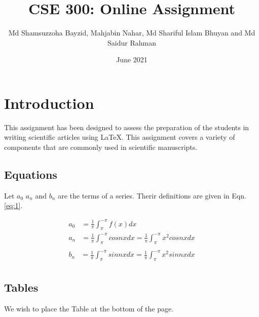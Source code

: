 \documentclass[14pt, a4paper]{article} %
\title{CSE 300: Online Assignment}
\author{Md Shamsuzzoha Bayzid, Mahjabin Nahar, Md Shariful Islam Bhuyan and Md Saidur Rahman}
\date{June 2021}
\begin{document}
\maketitle

\section{Introduction}
This assignment has been designed to assess the preparation of the students in writing scientific articles using \LaTeX. This assignment covers a variety of components that are commonly used in scientific manuscripts.

    \subsection{Equations}
    Let $a_0$ $a_n$ and $b_n$ are the terms of a series. Therir definitions are given in Eqn. \ref{eq:1}.
    \newline
    \begin{flushleft}
     \begin{equation*}
        \begin{split}
        a_0 &= \frac{1}{\pi} \int^{-\pi}_{\pi} f(x) dx \\
        a_n &= \frac{1}{\pi} \int^{-\pi}_{\pi} cosnx dx = \frac{1}{\pi} \int^{-\pi}_{\pi} x^2 cosnx dx \\
        \end{split}
        \end{equation*}
        \begin{equation}\label{eq:1}
        \begin{split}
        b_n &= \frac{1}{\pi} \int^{-\pi}_{\pi} sinnx dx = \frac{1}{\pi} \int^{-\pi}_{\pi} x^2 sinnx dx \\
        \end{split}
        \end{equation}
    \end{flushleft}
    \subsection{Tables}
    We wish to place the Table at the bottom of the page.
\end{document}
